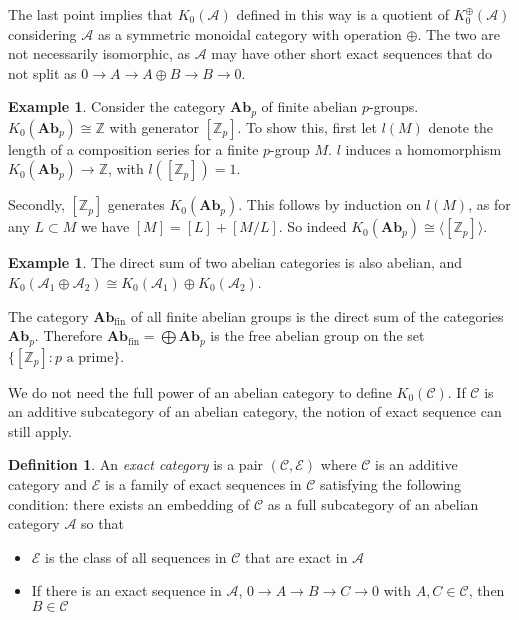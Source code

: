 \documentclass[10pt,a4paper]{article}
\theoremstyle{definition}
\newtheorem{example}[theorem]{Example}
\newtheorem{definition}[theorem]{Definition}
\begin{document}
The last point implies that $K_0(\mathcal{A})$ defined in this way is a quotient of $K_0^\oplus(\mathcal{A})$ considering $\mathcal{A}$ as a symmetric monoidal category with operation $\oplus$. The two are not necessarily isomorphic, as $\mathcal{A}$ may have other short exact sequences that do not split as $0 \to A \to A \oplus B \to B \to 0$.

\begin{example}
Consider the category $\mathbf{Ab}_p$ of finite abelian $p$-groups. $K_0(\mathbf{Ab}_p) \cong \mathbb{Z}$ with generator $[\mathbb{Z}_p]$. To show this, first let $l(M)$ denote the length of a composition series for a finite $p$-group $M$. $l$ induces a homomorphism $K_0(\mathbf{Ab}_p) \to \mathbb{Z}$, with $l([\mathbb{Z}_p]) = 1$.

Secondly, $[\mathbb{Z}_p]$ generates $K_0(\mathbf{Ab}_p)$. This follows by induction on $l(M)$, as for any $L \subset M$ we have $[M] = [L] + [M / L]$. So indeed $K_0(\mathbf{Ab}_p) \cong \langle [\mathbb{Z}_p] \rangle$.
\end{example}

\begin{example}
The direct sum of two abelian categories is also abelian, and $K_0(\mathcal{A}_1 \oplus \mathcal{A}_2) \cong K_0(\mathcal{A}_1) \oplus K_0(\mathcal{A}_2)$.

The category $\mathbf{Ab}_\text{fin}$ of all finite abelian groups is the direct sum of the categories $\mathbf{Ab}_p$. Therefore $\mathbf{Ab}_\text{fin} = \bigoplus \mathbf{Ab}_p$ is the free abelian group on the set $\{[\mathbb{Z}_p] : p \text{ a prime} \}$.
\end{example}

We do not need the full power of an abelian category to define $K_0(\mathcal{C})$. If $\mathcal{C}$ is an additive subcategory of an abelian category, the notion of exact sequence can still apply.

\begin{definition}
An \emph{exact category} is a pair $(\mathcal{C}, \mathcal{E})$ where $\mathcal{C}$ is an additive category and $\mathcal{E}$ is a family of exact sequences in $\mathcal{C}$ satisfying the following condition: there exists an embedding of $\mathcal{C}$ as a full subcategory of an abelian category $\mathcal{A}$ so that
\begin{itemize}
\itemsep0em
\item $\mathcal{E}$ is the class of all sequences in $\mathcal{C}$ that are exact in $\mathcal{A}$
\item If there is an exact sequence in $\mathcal{A}$, $0 \to A \to B \to C \to 0$ with $A, C \in \mathcal{C}$, then $B \in \mathcal{C}$
\end{itemize}
\end{definition}
\end{document}

